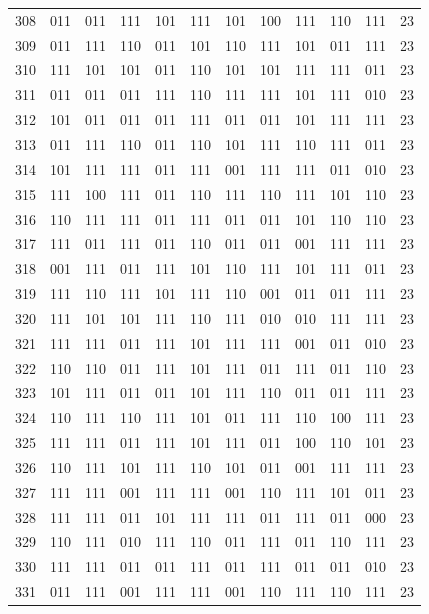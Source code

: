\begin{longtable}{r*{10}{c}r}
308 & 011 & 011 & 111 & 101 & 111 & 101 & 100 & 111 & 110 & 111 & 23\\
309 & 011 & 111 & 110 & 011 & 101 & 110 & 111 & 101 & 011 & 111 & 23\\
310 & 111 & 101 & 101 & 011 & 110 & 101 & 101 & 111 & 111 & 011 & 23\\
311 & 011 & 011 & 011 & 111 & 110 & 111 & 111 & 101 & 111 & 010 & 23\\
312 & 101 & 011 & 011 & 011 & 111 & 011 & 011 & 101 & 111 & 111 & 23\\
313 & 011 & 111 & 110 & 011 & 110 & 101 & 111 & 110 & 111 & 011 & 23\\
314 & 101 & 111 & 111 & 011 & 111 & 001 & 111 & 111 & 011 & 010 & 23\\
315 & 111 & 100 & 111 & 011 & 110 & 111 & 110 & 111 & 101 & 110 & 23\\
316 & 110 & 111 & 111 & 011 & 111 & 011 & 011 & 101 & 110 & 110 & 23\\
317 & 111 & 011 & 111 & 011 & 110 & 011 & 011 & 001 & 111 & 111 & 23\\
318 & 001 & 111 & 011 & 111 & 101 & 110 & 111 & 101 & 111 & 011 & 23\\
319 & 111 & 110 & 111 & 101 & 111 & 110 & 001 & 011 & 011 & 111 & 23\\
320 & 111 & 101 & 101 & 111 & 110 & 111 & 010 & 010 & 111 & 111 & 23\\
321 & 111 & 111 & 011 & 111 & 101 & 111 & 111 & 001 & 011 & 010 & 23\\
322 & 110 & 110 & 011 & 111 & 101 & 111 & 011 & 111 & 011 & 110 & 23\\
323 & 101 & 111 & 011 & 011 & 101 & 111 & 110 & 011 & 011 & 111 & 23\\
324 & 110 & 111 & 110 & 111 & 101 & 011 & 111 & 110 & 100 & 111 & 23\\
325 & 111 & 111 & 011 & 111 & 101 & 111 & 011 & 100 & 110 & 101 & 23\\
326 & 110 & 111 & 101 & 111 & 110 & 101 & 011 & 001 & 111 & 111 & 23\\
327 & 111 & 111 & 001 & 111 & 111 & 001 & 110 & 111 & 101 & 011 & 23\\
328 & 111 & 111 & 011 & 101 & 111 & 111 & 011 & 111 & 011 & 000 & 23\\
329 & 110 & 111 & 010 & 111 & 110 & 011 & 111 & 011 & 110 & 111 & 23\\
330 & 111 & 111 & 011 & 011 & 111 & 011 & 111 & 011 & 011 & 010 & 23\\
331 & 011 & 111 & 001 & 111 & 111 & 001 & 110 & 111 & 110 & 111 & 23\\

\end{longtable}
